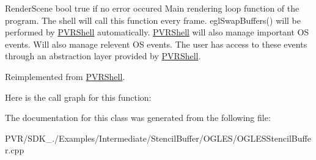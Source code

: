   Render\+Scene  bool true if no error occured  Main rendering loop function of the program. The shell will call this function every frame. egl\+Swap\+Buffers() will be performed by \hyperlink{class_p_v_r_shell}{P\+V\+R\+Shell} automatically. \hyperlink{class_p_v_r_shell}{P\+V\+R\+Shell} will also manage important O\+S events. Will also manage relevent O\+S events. The user has access to these events through an abstraction layer provided by \hyperlink{class_p_v_r_shell}{P\+V\+R\+Shell}. 

Reimplemented from \hyperlink{class_p_v_r_shell_ae0eb5f797cbe993a22b8659f9c332578}{P\+V\+R\+Shell}.



Here is the call graph for this function\+:




The documentation for this class was generated from the following file\+:\begin{DoxyCompactItemize}
\item 
P\+V\+R/\+S\+D\+K\+\_./\+Examples/\+Intermediate/\+Stencil\+Buffer/\+O\+G\+L\+E\+S/O\+G\+L\+E\+S\+Stencil\+Buffer.\+cpp\end{DoxyCompactItemize}
